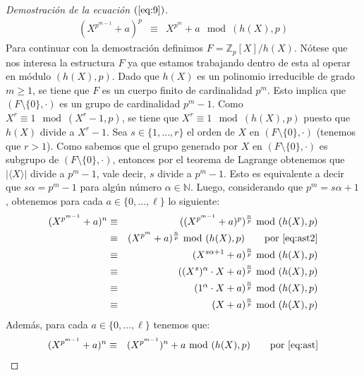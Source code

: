 \documentclass[10pt]{article}
\newcommand{\0}{\mathbf{0}}
\newcommand{\1}{\mathbf{1}}
\newcommand{\modulops}{\!\!\mod (X^r-1,p)}
\newcommand{\modulohps}{\!\!\mod (h(X),p)}
\newcommand{\+}{\oplus}
\newcommand{\comentarioin}[1]{}
\theoremstyle{remark}
\theoremstyle{remark}
\begin{document}
\begin{proof}[Demostración de la ecuación $(\ref{eq:9})$]
\begin{eqnarray}
		    (X^{p^{m-1}}+a)^p & \equiv & X^{p^{m}} +a \modulohps \label{eq:ast2} 
		\end{eqnarray}
		Para continuar con la demostración definimos $F = \mathbb{Z}_p[X]/h(X)$. Nótese que nos interesa la estructura $F$ ya que estamos trabajando dentro de esta al operar en módulo $(h(X),p)$. Dado que $h(X)$ es un polinomio irreducible de grado $m\geq 1$, se tiene que $F$ es un cuerpo finito de cardinalidad $p^m$. Esto implica que $(F\setminus\{0\},\cdot)$ 
		es un grupo de cardinalidad $p^m-1$.
		Como $X^r\equiv 1 \modulops$, se tiene que $X^r\equiv 1 \modulohps$ puesto que $h(X)$ divide a $X^r-1$.
		Sea $s \in \{1, \ldots, r\}$ el orden de $X$ en $(F\setminus\{0\},\cdot)$ (tenemos que $r > 1$).
		 Como sabemos que el grupo  generado por $X$ en $(F\setminus\{0\},\cdot)$ es subgrupo de $(F\setminus\{0\},\cdot)$, entonces por el teorema de Lagrange obtenemos que $|\langle X\rangle |$ divide a $p^m-1$, vale decir, $s$ divide a $p^m-1$. Esto es equivalente a decir que $s \alpha = p^m -1$ para algún número $\alpha \in \mathbb{N}$. Luego, considerando que  %
		$p^m=s\alpha +1$, obtenemos para cada $a \in \{0, \ldots, \ell\}$ lo siguiente:
		\begin{eqnarray}
		    (X^{p^{m-1}}+a)^n & \equiv &((X^{p^{m-1}}+a)^p)^{\frac{n}{p}}\modulohps\nonumber\\
		    & \equiv &(X^{p^{m}}+a)^{\frac{n}{p}}\modulohps \quad\quad \text{por }\eqref{eq:ast2} \nonumber\\
		    & \equiv &(X^{s\alpha +1}+a)^{\frac{n}{p}}\modulohps\nonumber\\
		    & \equiv &((X^{s})^{\alpha} \cdot X+a)^{\frac{n}{p}}\modulohps\nonumber\\
		    & \equiv &(1^{\alpha} \cdot X+a)^{\frac{n}{p}}\modulohps\nonumber\\
		    & \equiv &(X+a)^{\frac{n}{p}}\modulohps\label{eq:+}
		\end{eqnarray}
		Además, para cada $a \in \{0, \ldots, \ell\}$ tenemos que:
		\begin{eqnarray}
		    (X^{p^{m-1}}+a)^n & \equiv &(X^{p^{m-1}})^n + a\modulohps \quad\quad \text{por }\eqref{eq:ast} \nonumber\\

\end{eqnarray}
\end{proof}
\end{document}
